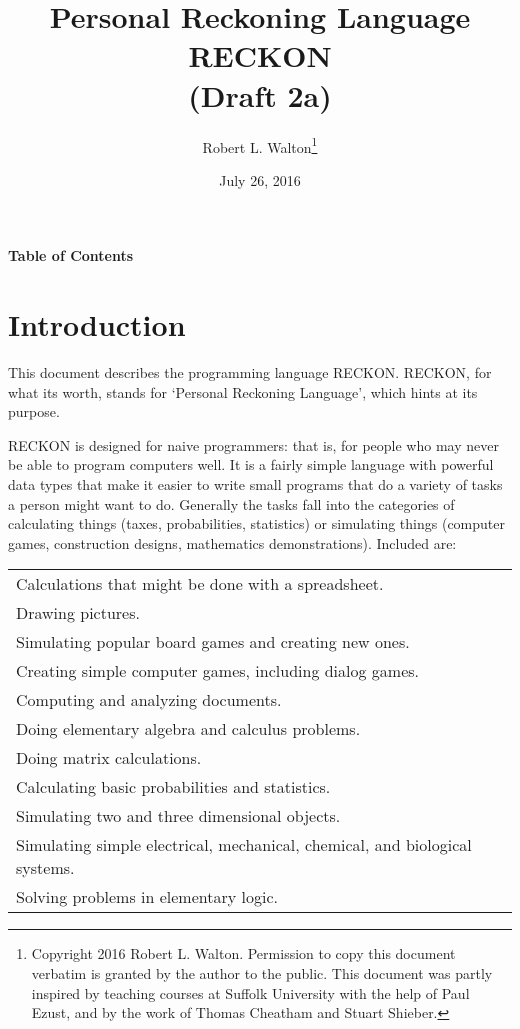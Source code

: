 \documentclass[12pt]{article}
\makeatletter
\renewcommand\tableofcontents{%
    \begin{list}{}%
	     {\setlength{\itemsep}{0in}%
	      \setlength{\topsep}{0in}%
	      \setlength{\parsep}{1ex}%
	      \setlength{\labelwidth}{0in}%
	      \setlength{\baselineskip}{1.5ex}%
	      \setlength{\leftmargin}{0.8in}%
	      \setlength{\rightmargin}{0.8in}}%
    \item\@starttoc{toc}%
    \end{list}}
\makeatother
\begin{document}
        
\title{Personal Reckoning Language\\[2ex]
       RECKON\\[2ex]
       (Draft 2a)}

\author{Robert L. Walton\thanks{Copyright 2016 Robert L. Walton.
Permission to copy this document verbatim is granted by the author
to the public.  This document was partly inspired
by teaching courses at Suffolk University with the help of
Paul Ezust, and by the work of Thomas
Cheatham and Stuart Shieber.}}

\date{July 26, 2016}

\maketitle

\newpage
\begin{center}
\large \bf Table of Contents
\end{center}

\bigskip

\tableofcontents 

\newpage

\section{Introduction}

This document describes the programming language RECKON.  RECKON,
for what its worth, stands for `Personal Reckoning Language',
which hints at its purpose.

RECKON is designed for naive programmers: that is, for people who may never
be able to program computers well.  It is a fairly simple language with
powerful data types that make it easier to write small programs
that do a variety of tasks a person might want to do.  Generally
the tasks fall into the categories of calculating things (taxes,
probabilities, statistics) or simulating things
(computer games, construction designs, mathematics demonstrations).
Included are:

\begin{center}
\begin{tabular}{l}
Calculations that might be done with a spreadsheet. \\
Drawing pictures. \\
Simulating popular board games and creating new ones. \\
Creating simple computer games, including dialog games. \\
Computing and analyzing documents. \\
Doing elementary algebra and calculus problems. \\
Doing matrix calculations. \\ 
Calculating basic probabilities and statistics. \\
Simulating two and three dimensional objects. \\
Simulating simple electrical, mechanical, chemical, and biological systems.\\
Solving problems in elementary logic. \\
\end{tabular}
\end{center}
\end{document}
